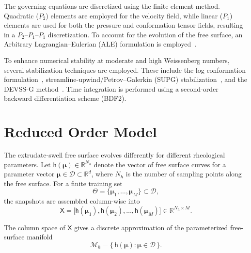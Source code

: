 \documentclass{elsarticle}
\newcommand{\mat}[1]{\mathsf{#1}}
\newcommand{\params}{\boldsymbol{\mu}}
\begin{document}
The governing equations are discretized using the finite element method. Quadratic ($P_2$) elements are employed for the velocity field, while linear ($P_1$) elements are used for both the pressure and conformation tensor fields, resulting in a $P_2$–$P_1$–$P_1$ discretization. To account for the evolution of the free surface, an Arbitrary Lagrangian–Eulerian (ALE) formulation is employed~\cite{hughes1981ale,donea1982ale}.

To enhance numerical stability at moderate and high Weissenberg numbers, several stabilization techniques are employed. These include the log-conformation formulation~\cite{hulsen2005flow,fattal2004constitutive}, streamline-upwind/Petrov–Galerkin (SUPG) stabilization~\cite{brooks1982streamline}, and the DEVSS-G method~\cite{bogaerds2004stability}. Time integration is performed using a second-order backward differentiation scheme (BDF2).


\section{Reduced Order Model}
\label{sec:rom}

The extrudate-swell free surface evolves differently for different
rheological parameters. Let $\mat{h}(\params) \in \mathbb{R}^{N_h}$ denote the vector of
free surface curves for a parameter vector
$\params \in \mathcal{D} \subset \mathbb{R}^{d}$, where $N_h$ is the number of sampling points along the free surface. For a finite training
set
\[
    \Theta = \{\params_1,\dots,\params_M\} \subset \mathcal{D},
\]
the snapshots are assembled column-wise into
\begin{equation}
    \mat{X}
    =
    \bigl[
        \mat{h}(\params_1),
        \mat{h}(\params_2),
        \dots,
        \mat{h}(\params_M)
    \bigr]
    \in \mathbb{R}^{N_h \times M}.
    \label{eq:snapshot_matrix}
\end{equation}

The column space of $\mat{X}$ gives a discrete approximation of the
parameterized free-surface manifold
\[
    \mathcal{M}_h
    =
    \{\,\mat{h}(\params): \params \in \mathcal{D}\,\}.
\]
\end{document}
